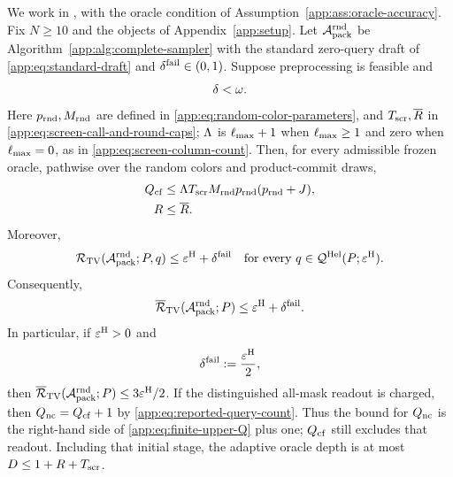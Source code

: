 \begin{theorem}
\label{app:thm:finite-upper}
We work in \HellingerCase, with the oracle condition of
Assumption~\ref{app:ass:oracle-accuracy}.
Fix $N\ge10$ and the objects of Appendix~\ref{app:setup}.  Let
$\mathcal A_{\mathrm{pack}}^{\mathrm{rnd}}$ be Algorithm~\ref{app:alg:complete-sampler} with
the standard zero-query draft of \eqref{app:eq:standard-draft} and
$\delta^{\mathrm{fail}}\in(0,1)$.  Suppose preprocessing is feasible and
\begin{equation}
 \delta<\omega.
 \label{app:eq:finite-screen-separation}
\end{equation}
Here $p_{\mathrm{rnd}},M_{\mathrm{rnd}}$ are defined in
\eqref{app:eq:random-color-parameters}, and
$T_{\mathrm{scr}},\overline R$ in
\eqref{app:eq:screen-call-and-round-caps}; $\Lambda$ is
$\ell_{\max}+1$ when $\ell_{\max}\ge1$ and zero when $\ell_{\max}=0$, as in
\eqref{app:eq:screen-column-count}.
Then, for every admissible frozen oracle, pathwise over the random colors
and product-commit draws,
\begin{align}
 Q_{\mathrm{cf}}
 &\le \Lambda T_{\mathrm{scr}}M_{\mathrm{rnd}}
       p_{\mathrm{rnd}}(p_{\mathrm{rnd}}+J),
 \label{app:eq:finite-upper-Q}\\
 R
 &\le\overline R.
 \label{app:eq:finite-upper-R}
\end{align}
Moreover,
\begin{equation}
 \mathcal R_{\mathrm{TV}}(\mathcal A_{\mathrm{pack}}^{\mathrm{rnd}};P,q)
 \le
 \varepsilon^{\mathrm H}+\delta^{\mathrm{fail}}
 \quad\text{for every }
 q\in\mathcal Q^{\mathrm{Hel}}(P;\varepsilon^{\mathrm H}).
 \label{app:eq:finite-upper-seed-risk}
\end{equation}
Consequently,
\begin{equation}
 \overline{\mathcal R}_{\mathrm{TV}}(\mathcal A_{\mathrm{pack}}^{\mathrm{rnd}};P)
 \le
 \varepsilon^{\mathrm H}+\delta^{\mathrm{fail}}.
 \label{app:eq:finite-upper-risk}
\end{equation}
In particular, if $\varepsilon^{\mathrm H}>0$ and
\begin{equation}
 \delta^{\mathrm{fail}}:=\frac{\varepsilon^{\mathrm H}}{2},
 \label{app:eq:finite-failure-budget-choice}
\end{equation}
then
$\overline{\mathcal R}_{\mathrm{TV}}(\mathcal A_{\mathrm{pack}}^{\mathrm{rnd}};P)\le3\varepsilon^{\mathrm H}/2$.
If the distinguished all-mask readout is charged, then
$Q_{\mathrm{nc}}=Q_{\mathrm{cf}}+1$ by
\eqref{app:eq:reported-query-count}.  Thus the bound for
$Q_{\mathrm{nc}}$ is the right-hand side of
\eqref{app:eq:finite-upper-Q} plus one; $Q_{\mathrm{cf}}$ still
excludes that readout.
Including that initial stage, the adaptive oracle depth is at most
$D\le1+R+T_{\mathrm{scr}}$.
\end{theorem}

